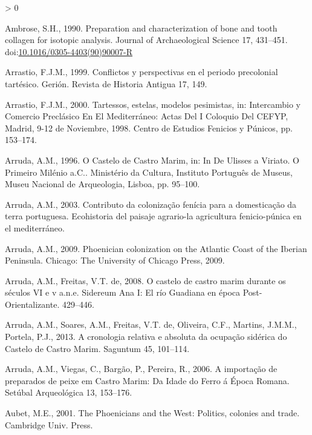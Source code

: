\documentclass[5p]{elsarticle} %
\newlength{\cslhangindent}
\newenvironment{CSLReferences}[2] %
 {%
  \setlength{\parindent}{0pt}
  \ifodd #1 \everypar{\setlength{\hangindent}{\cslhangindent}}\ignorespaces\fi
  \ifnum #2 > 0
  \setlength{\parskip}{#2\baselineskip}
  \fi
 }%
 {}
\begin{document}
\hypertarget{refs}{}
\begin{CSLReferences}{1}{0}
\leavevmode\hypertarget{ref-ambrose90}{}%
Ambrose, S.H., 1990. Preparation and characterization of bone and tooth collagen for isotopic analysis. Journal of Archaeological Science 17, 431--451. doi:\href{https://doi.org/10.1016/0305-4403(90)90007-R}{10.1016/0305-4403(90)90007-R}

\leavevmode\hypertarget{ref-arrastio99}{}%
Arrastio, F.J.M., 1999. Conflictos y perspectivas en el periodo precolonial tartésico. Gerión. Revista de Historia Antigua 17, 149.

\leavevmode\hypertarget{ref-arrastio00}{}%
Arrastio, F.J.M., 2000. Tartessos, estelas, modelos pesimistas, in: Intercambio y Comercio Preclásico En El {Mediterráneo}: Actas Del {I} Coloquio Del {CEFYP}, {Madrid}, 9-12 de Noviembre, 1998. {Centro de Estudios Fenicios y Púnicos}, pp. 153--174.

\leavevmode\hypertarget{ref-arruda96}{}%
Arruda, A.M., 1996. O {Castelo} de {Castro Marim}, in: In {De Ulisses} a {Viriato}. {O} Primeiro Milénio a.{C}.. {Ministério da Cultura, Instituto Português de Museus, Museu Nacional de Arqueologia}, {Lisboa}, pp. 95--100.

\leavevmode\hypertarget{ref-arruda03}{}%
Arruda, A.M., 2003. Contributo da colonização fenícia para a domesticação da terra portuguesa. Ecohistoria del paisaje agrario-la agricultura fenicio-púnica en el mediterráneo.

\leavevmode\hypertarget{ref-arruda09}{}%
Arruda, A.M., 2009. Phoenician colonization on the {Atlantic Coast} of the {Iberian Peninsula}. {Chicago: The University of Chicago Press, 2009.}

\leavevmode\hypertarget{ref-arruda_freitas08}{}%
Arruda, A.M., Freitas, V.T. de, 2008. O castelo de castro marim durante os séculos VI e v a.n.e. Sidereum Ana I: El río Guadiana en época Post-Orientalizante. 429--446.

\leavevmode\hypertarget{ref-arruda_etal13}{}%
Arruda, A.M., Soares, A.M., Freitas, V.T. de, Oliveira, C.F., Martins, J.M.M., Portela, P.J., 2013. A cronologia relativa e absoluta da ocupação sidérica do {Castelo} de {Castro Marim}. Saguntum 45, 101--114.

\leavevmode\hypertarget{ref-arruda_etal06}{}%
Arruda, A.M., Viegas, C., Bargão, P., Pereira, R., 2006. A importação de preparados de peixe em {Castro Marim}: Da {Idade} do {Ferro} á {Época Romana}. Setúbal Arqueológica 13, 153--176.

\leavevmode\hypertarget{ref-aubet01}{}%
Aubet, M.E., 2001. The {Phoenicians} and the {West}: Politics, colonies and trade. {Cambridge Univ. Press}.


\end{CSLReferences}
\end{document}
